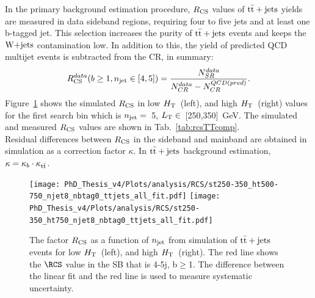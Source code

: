 In the primary background estimation procedure, $R_{\rm CS}$ values of ${\rm t\bar{t}+jets}$ yields are measured in data sideband regions, requiring four to five jets and at least one b-tagged jet. This selection increases the purity of ${\rm t\bar{t}+jets}$ events and keeps the $\textrm{W+jets}$ contamination low. In addition to this, the yield of predicted QCD multijet events is subtracted from the CR, in summary:
\begin{equation}
\label{eq:rcsTTdata}
R_{\rm CS}^{data}(b \geq 1, n_{\rm jet} \in [4,5] ) = \frac{N_{SR}^{data}}{N_{CR}^{data}-N_{CR}^{QCD(pred)}}.
\end{equation}
Figure~\ref{RCS_dataMCtt} shows the simulated $R_{\rm CS}$ in low $H_{\rm T}$~(left), and high $H_{\rm T}$~(right) values for the first search bin which is $n_{\rm jet} =$~5, $L_{\rm T} \in$~[250,350]~GeV. The simulated and measured $R_{\rm CS}$ values are shown in Tab.~\ref{tab:rcsTTcomp}.\\
Residual differences between $R_{\rm CS}$ in the sideband and mainband are obtained in simulation as a correction factor $\kappa$. In ${\rm t\bar{t}+jets}$ background estimation, $\kappa=\kappa_b\cdot\kappa_{\rm t\bar{t}}$.
\begin{figure}[!hbt]
    \begin{center}
 \texttt{[image: PhD\_Thesis\_v4/Plots/analysis/RCS/st250-350\_ht500-750\_njet8\_nbtag0\_ttjets\_all\_fit.pdf]}
    \texttt{[image: PhD\_Thesis\_v4/Plots/analysis/RCS/st250-350\_ht750\_njet8\_nbtag0\_ttjets\_all\_fit.pdf]}
  \caption{ \label{RCS_dataMCtt}  The factor $R_{\rm CS}$ as a function of $n_{\rm jet}$ from simulation of ${\rm t\bar{t}+jets}$ events for low $H_{\rm T}$~(left), and high $H_{\rm T}$~(right). The red line shows the $\RCS$ value in the SB that is 4-5j, b$\geq$1. The difference between the linear fit and the red line is used to measure systematic uncertainty.}
  \end{center}
\end{figure}
